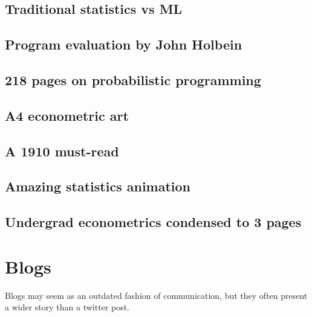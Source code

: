 \documentclass[letterpaper,10pt,english]{sphinxmanual}
\begin{document}
\section{Traditional statistics vs ML}
\label{\detokenize{tweets:traditional-statistics-vs-ml}}



\section{Program evaluation by John Holbein}
\label{\detokenize{tweets:program-evaluation-by-john-holbein}}



\section{218 pages on probabilistic programming}
\label{\detokenize{tweets:pages-on-probabilistic-programming}}



\section{A4 econometric art}
\label{\detokenize{tweets:a4-econometric-art}}



\section{A 1910 must-read}
\label{\detokenize{tweets:a-1910-must-read}}



\section{Amazing statistics animation}
\label{\detokenize{tweets:amazing-statistics-animation}}



\section{Undergrad econometrics condensed to 3 pages}
\label{\detokenize{tweets:undergrad-econometrics-condensed-to-3-pages}}
 


\chapter{Blogs}
\label{\detokenize{blogs:blogs}}\label{\detokenize{blogs::doc}}
Blogs may seem as an outdated fashion of communication, but they often present
a wider story than a twitter post.
\end{document}
